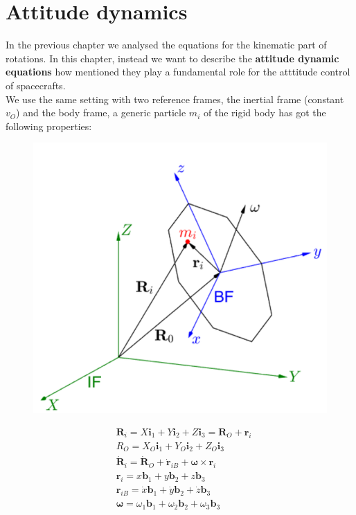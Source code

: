 \section{Attitude dynamics}
In the previous chapter we analysed the equations for the kinematic part of rotations. In this chapter, instead we want to describe the \textbf{attitude dynamic equations} how mentioned they play a fundamental role for the atttitude control of spacecrafts.\\
We use the same setting with two reference frames, the inertial frame (constant $v_O$) and the body frame, a generic particle $m_i$ of the rigid body has got the following properties:

\begin{figure}[h]
    \centering 
    \includegraphics[scale=0.5]{AerospaceApplications/images/IF_BF.png}    
\end{figure}

\begin{align*}
    &\mathbf{R}_i = X\mathbf{i}_1 +  Y \mathbf{i}_2 + Z \mathbf{i}_3 = \mathbf{R}_O+\mathbf{r}_i\\
    &R_O= X_O\mathbf{i}_1 +  Y_O \mathbf{i}_2 + Z_O \mathbf{i}_3\\
    &\dot{\mathbf{R}}_i = \dot{\mathbf{R}}_O + 
    \dot{\mathbf{r}}_{iB}+\boldsymbol{\omega}\times\mathbf{r}_i\\
    &\mathbf{r}_i=x\mathbf{b}_1+y\mathbf{b}_2+z\mathbf{b}_3\\
    &\mathbf{r}_{iB}=\dot{x}\mathbf{b}_1+\dot{y}\mathbf{b}_2+\dot{z}\mathbf{b}_3\\
    &\boldsymbol{\omega} = \omega_1\mathbf{b}_1+\omega_2\mathbf{b}_2+\omega_3{\mathbf{b}}_3
\end{align*}

